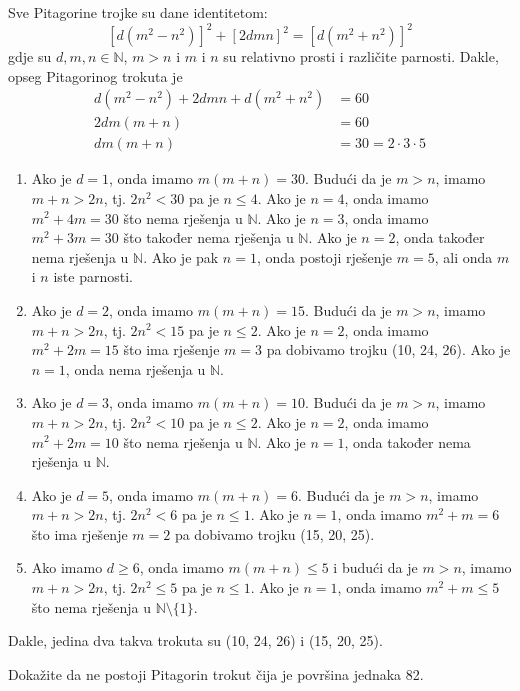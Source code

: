 \documentclass{exam}
\begin{document}
\begin{questions}
\begin{solution}
  Sve Pitagorine trojke su dane identitetom:
  \[
    [d(m^2-n^2)]^2 + [2dmn]^2 = [d(m^2+n^2)]^2
  \]
  gdje su $d, m, n \in \mathbb{N}$, $m > n$ i $m$ i $n$ su relativno prosti i različite parnosti. Dakle, opseg Pitagorinog trokuta je
  \begin{align*}
    d(m^2-n^2) + 2dmn + d(m^2+n^2) &= 60\\
    2dm(m + n) &= 60\\
    dm(m + n) &= 30 = 2 \cdot 3 \cdot 5
  \end{align*}
  \begin{enumerate}
    \item Ako je $d = 1$, onda imamo $m(m + n) = 30$. Budući da je $m > n$, imamo $m + n > 2n$, tj. $2n^2 < 30$ pa je $n \leq 4$. Ako je $n = 4$, onda imamo $m^2 + 4m = 30$ što nema rješenja u $\mathbb{N}$. Ako je $n = 3$, onda imamo $m^2 + 3m = 30$ što također nema rješenja u $\mathbb{N}$. Ako je $n = 2$, onda također nema rješenja u $\mathbb{N}$. Ako je pak $n = 1$, onda postoji rješenje $m = 5$, ali onda $m$ i $n$ iste parnosti.
    \item Ako je $d = 2$, onda imamo $m(m + n) = 15$. Budući da je $m > n$, imamo $m + n > 2n$, tj. $2n^2 < 15$ pa je $n \leq 2$. Ako je $n = 2$, onda imamo $m^2 + 2m = 15$ što ima rješenje $m = 3$ pa dobivamo trojku (10, 24, 26). Ako je $n = 1$, onda  nema rješenja u $\mathbb{N}$.
    \item Ako je $d = 3$, onda imamo $m(m + n) = 10$. Budući da je $m > n$, imamo $m + n > 2n$, tj. $2n^2 < 10$ pa je $n \leq 2$. Ako je $n = 2$, onda imamo $m^2 + 2m = 10$ što nema rješenja u $\mathbb{N}$. Ako je $n = 1$, onda također nema rješenja u $\mathbb{N}$.
    \item Ako je $d = 5$, onda imamo $m(m + n) = 6$. Budući da je $m > n$, imamo $m + n > 2n$, tj. $2n^2 < 6$ pa je $n \leq 1$. Ako je $n = 1$, onda imamo $m^2 + m = 6$ što ima rješenje $m = 2$ pa dobivamo trojku (15, 20, 25).
    \item Ako imamo $d \geq 6$, onda imamo $m(m + n) \leq 5$ i budući da je $m > n$, imamo $m + n > 2n$, tj. $2n^2 \leq 5$ pa je $n \leq 1$. Ako je $n = 1$, onda imamo $m^2 + m \leq 5$ što nema rješenja u $\mathbb{N} \setminus \{1\}$.
  \end{enumerate}
  Dakle, jedina dva takva trokuta su (10, 24, 26) i (15, 20, 25).
\end{solution}

\pagebreak

\question Dokažite da ne postoji Pitagorin trokut čija je površina jednaka 82.


\end{questions}
\end{document}
